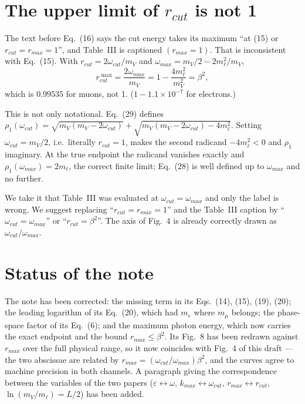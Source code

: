 \documentclass[11pt]{article}
\begin{document}
\section{The upper limit of $r_{cut}$ is not 1}

The text before Eq.~(16) says the cut energy takes its maximum ``at (15) or
$r_{cut}=r_{max}=1$'', and Table~III is captioned $(r_{max}=1)$. That is
inconsistent with Eq.~(15). With $r_{cut}=2\omega_{cut}/m_V$ and
$\omega_{max}=m_V/2-2m_\ell^{2}/m_V$,
\begin{equation*}
r_{cut}^{\;\max}=\frac{2\omega_{max}}{m_V}=1-\frac{4m_\ell^{2}}{m_V^{2}}=\beta^{2},
\end{equation*}
which is $0.99535$ for muons, not 1. ($1-1.1\times10^{-7}$ for electrons.)

This is not only notational. Eq.~(29) defines
$\rho_1(\omega_{cut})=\sqrt{m_V(m_V-2\omega_{cut})}+\sqrt{m_V(m_V-2\omega_{cut})-4m_\ell^{2}}$.
Setting $\omega_{cut}=m_V/2$, i.e.\ literally $r_{cut}=1$, makes the second
radicand $-4m_\ell^{2}<0$ and $\rho_1$ imaginary. At the true endpoint the
radicand vanishes exactly and $\rho_1(\omega_{max})=2m_\ell$, the correct finite
limit; Eq.~(28) is well defined up to $\omega_{max}$ and no further.

We take it that Table~III was evaluated at $\omega_{cut}=\omega_{max}$ and only
the label is wrong. We suggest replacing ``$r_{cut}=r_{max}=1$'' and the
Table~III caption by ``$\omega_{cut}=\omega_{max}$'' or ``$r_{cut}=\beta^{2}$''.
The axis of Fig.~4 is already correctly drawn as $\omega_{cut}/\omega_{max}$.

\section{Status of the note}

The note has been corrected: the missing term in its Eqs.~(14), (15), (19), (20);
the leading logarithm of its Eq.~(20), which had $m_e$ where $m_\mu$ belongs; the
phase-space factor of its Eq.~(6); and the maximum photon energy, which now
carries the exact endpoint and the bound $r_{max}\le\beta^{2}$. Its Fig.~8 has
been redrawn against $r_{max}$ over the full physical range, so it now coincides
with Fig.~4 of this draft --- the two abscissae are related by
$r_{max}=(\omega_{cut}/\omega_{max})\beta^{2}$, and the curves agree to machine
precision in both channels. A paragraph giving the correspondence between the
variables of the two papers ($\varepsilon\leftrightarrow\omega$,
$k_{max}\leftrightarrow\omega_{cut}$, $r_{max}\leftrightarrow r_{cut}$,
$\ln(m_V/m_\ell)=L/2$) has been added.
\end{document}

